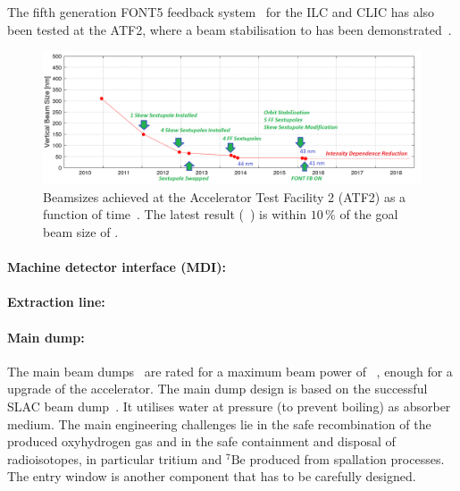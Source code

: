 The fifth generation FONT5 feedback system~\cite{Apsimon:2018bpq} for the ILC and CLIC has also been tested at the ATF2, where a beam stabilisation to  has been demonstrated~\cite{Ramjiawan:2018egu}.

\begin{figure}[htbp]
   \includegraphics[width=\hsize]{chapters/figures/ATF2trend2018}
\caption{Beamsizes achieved at the Accelerator Test Facility 2 (ATF2) as a function of time~\cite{bib:atf2esu}. The latest result (~\cite{Okugi:2017jji}) is within $10\,\%$ of the goal beam size of .}
\label{fig:atf-results}
\end{figure}

\paragraph {Machine detector interface (MDI):}




\paragraph {Extraction line:}



\paragraph {Main dump:}

The main beam dumps~\cite[Sect. 8.8]{Adolphsen:2013kya} are rated for a maximum beam power of ~\cite{bib:cr-0013}, enough for a  upgrade of the accelerator.
The main dump design is based on the successful SLAC  beam dump~\cite{Walz:1967nz}.
It  utilises water at  pressure (to prevent boiling) as absorber medium. 
The main engineering challenges lie in the safe recombination of the produced oxyhydrogen gas and in the safe containment and disposal of radioisotopes, in particular tritium and $^7{\mathrm{Be}}$ produced from spallation processes.
The entry window is another component that has to be carefully designed. 


